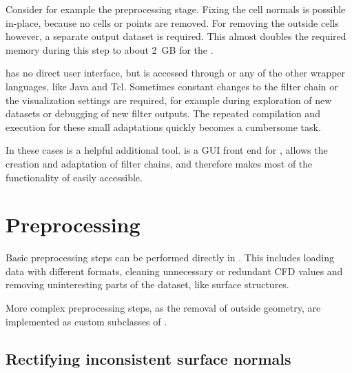 Consider for example the preprocessing stage. Fixing the cell normals is possible in-place, because no cells or points are removed. For removing the outside cells however, a separate output dataset is required. This almost doubles the required memory during this step to about \SI{2}{GB} for the \toyotadataset.

\vtk has no direct user interface, but is accessed through \Cpp or any of the other wrapper languages, like Java and Tcl. Sometimes constant changes to the filter chain or the visualization settings are required, for example during exploration of new datasets or debugging of new filter outputs. The repeated compilation and execution for these small adaptations quickly becomes a cumbersome task.

In these cases \emph{\paraview}is a helpful additional tool. \paraview is a \ac{GUI} front end for \vtk, allows the creation and adaptation of filter chains, and therefore makes most of the functionality of \vtk easily accessible.





\section{Preprocessing} 
\label{sec:impl:preprocessing}
Basic preprocessing steps can be performed directly in \paraview. This includes loading data with different formats, cleaning unnecessary or redundant \ac{CFD} values and removing uninteresting parts of the dataset, like \twod surface structures.

More complex preprocessing steps, as the removal of outside geometry, are implemented as custom subclasses of .


\subsection{Rectifying inconsistent surface normals}
\label{sec:impl:surface-normals}

